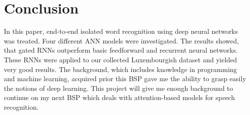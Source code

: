 
\section{Conclusion}

In this paper, end-to-end isolated word recognition using deep neural networks
was treated. Four different ANN models were investigated. The results showed,
that gated RNNs outperform basic feedforward and recurrent neural networks.
These RNNs were applied to our collected Luxembourgish dataset and yielded very
good results. The background, which includes knowledge in programming and
machine learning, acquired prior this BSP gave me the ability to grasp easily the
notions of deep learning. This project will give me enough background to
continue on my next BSP which deals with attention-based models for speech
recognition.

